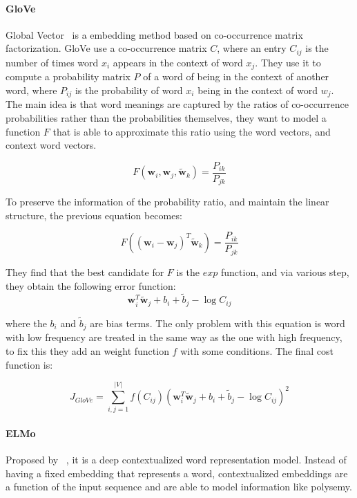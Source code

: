 \paragraph{GloVe} 
Global Vector~\citep{pennington2014glove} is a embedding method based on co-occurrence matrix factorization. GloVe use a co-occurrence matrix $C$, where an entry $C_{ij}$ is the number of times word $x_i$ appears in the context of word $x_j$. They use it to compute a probability matrix $P$ of a word of being in the context of another word, where $P_{ij}$ is the probability of word $x_i$ being in the context of word $w_j$. The main idea is that word meanings are captured by the ratios of co-occurrence probabilities rather than the probabilities themselves, they want to model a function $F$ that is able to approximate this ratio using the word vectors, and context word vectors.

\begin{equation}
F\left(\mathbf{w}_{i}, \mathbf{w}_{j}, \tilde{\mathbf{w}}_{k}\right)=\frac{P_{i k}}{P_{j k}}
\end{equation}

To preserve the information of the probability ratio, and maintain the linear structure, the previous equation becomes: 

\begin{equation}
F\left(\left(\mathbf{w}_{i}-\mathbf{w}_{j}\right)^{T} \tilde{\mathbf{w}}_{k}\right)=\frac{P_{i k}}{P_{j k}}
\end{equation}

They find that the best candidate for $F$ is the $exp$ function, and via various step, they obtain the following error function:
\begin{equation}
    \mathbf{w}_{i}^{T} \tilde{\mathbf{w}}_{j}+b_{i}+\tilde{b}_{j}-\log C_{i j}
\end{equation}

where the $b_i$ and $\tilde{b}_j$ are bias terms. The only problem with this equation is word with low frequency are treated in the same way as the one with high frequency, to fix this they add an weight function $f$ with some conditions. The final cost function is:

\begin{equation}
J_{GloVe} = \sum_{i, j=1}^{|V|} f\left(C_{i j}\right)\left(\mathbf{w}_{i}^{T} \tilde{\mathbf{w}}_{j}+b_{i}+\tilde{b}_{j}-\log C_{i j}\right)^{2}
\end{equation}

\paragraph{ELMo} Proposed by ~\cite{peters2018elmo}, it is a deep contextualized word representation model. Instead of having a fixed embedding that represents a word, contextualized embeddings are a function of the input sequence and are able to model information like polysemy.

